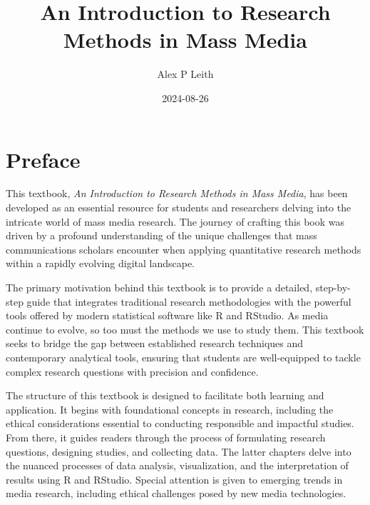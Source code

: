 \documentclass[
]{book}
\title{An Introduction to Research Methods in Mass Media}
\author{Alex P Leith}
\date{2024-08-26}
\begin{document}
\maketitle

{
\setcounter{tocdepth}{1}
\tableofcontents
}
\chapter*{Preface}\label{preface}

This textbook, \emph{An Introduction to Research Methods in Mass Media}, has been developed as an essential resource for students and researchers delving into the intricate world of mass media research. The journey of crafting this book was driven by a profound understanding of the unique challenges that mass communications scholars encounter when applying quantitative research methods within a rapidly evolving digital landscape.

The primary motivation behind this textbook is to provide a detailed, step-by-step guide that integrates traditional research methodologies with the powerful tools offered by modern statistical software like R and RStudio. As media continue to evolve, so too must the methods we use to study them. This textbook seeks to bridge the gap between established research techniques and contemporary analytical tools, ensuring that students are well-equipped to tackle complex research questions with precision and confidence.

The structure of this textbook is designed to facilitate both learning and application. It begins with foundational concepts in research, including the ethical considerations essential to conducting responsible and impactful studies. From there, it guides readers through the process of formulating research questions, designing studies, and collecting data. The latter chapters delve into the nuanced processes of data analysis, visualization, and the interpretation of results using R and RStudio. Special attention is given to emerging trends in media research, including ethical challenges posed by new media technologies.
\end{document}
